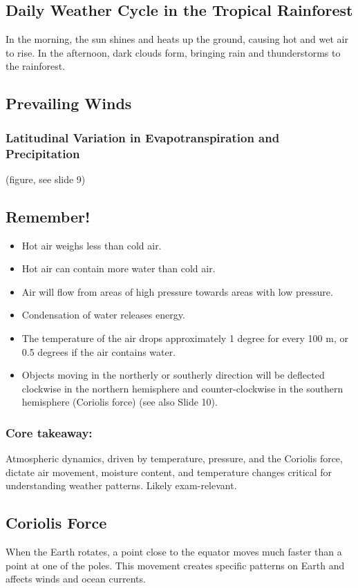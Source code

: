 \subsection{Daily Weather Cycle in the Tropical Rainforest} 
In the morning, the sun shines and heats up the ground, causing hot and wet air to rise. In the afternoon, dark clouds form, bringing rain and thunderstorms to the rainforest.


\subsection{Prevailing Winds} 
\subsubsection*{Latitudinal Variation in Evapotranspiration and Precipitation} 
(figure, see slide 9)
\subsection{Remember!} 
\begin{itemize} 
    \item Hot air weighs less than cold air. 
    \item Hot air can contain more water than cold air. 
    \item Air will flow from areas of high pressure towards areas with low pressure. 
    \item Condensation of water releases energy. 
    \item The temperature of the air drops approximately 1 degree for every 100 m, or 0.5 degrees if the air contains water. 
    \item Objects moving in the northerly or southerly direction will be deflected clockwise in the northern hemisphere and counter-clockwise in the southern hemisphere (Coriolis force) (see also Slide 10). 
\end{itemize}

\subsubsection*{Core takeaway:} 
Atmospheric dynamics, driven by temperature, pressure, and the Coriolis force, dictate air movement, moisture content, and temperature changes critical for understanding weather patterns. Likely exam-relevant.


\subsection{Coriolis Force} 
When the Earth rotates, a point close to the equator moves much faster than a point at one of the poles. This movement creates specific patterns on Earth and affects winds and ocean currents.

